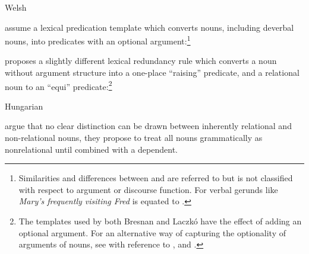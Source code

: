 \documentclass[output=paper,hidelinks]{langscibook}
\begin{document}
\ea\label{Welsharg} Welsh
\z\z

\citet[315--319]{BresnanEtAl2016}  assume a lexical predication template which converts nouns, including deverbal nouns, into predicates with an optional {\POSS} argument:\footnote{Similarities and differences between {\POSS} and {\SUBJ} are referred to but {\POSS} is not classified with respect to argument or discourse function. For verbal gerunds like \emph{Mary's frequently visiting Fred} {\POSS} is equated to {\SUBJ}.}

\eal
{}
\zl	
	
 \citet{Laczko07} proposes a slightly different lexical redundancy rule which converts a noun without argument structure into a one-place ``raising'' predicate, and a relational noun to an ``equi'' predicate:\footnote{The templates used by both Bresnan and Laczk\'o have the effect of adding an optional argument. For an alternative way of capturing the optionality of arguments of nouns, see \citet[293--294]{Lowe17} with reference to \citet{AsudGior12, GiorAsud12}, and \citet{asudeh2014meaning}.}%
 
\ea Hungarian
\z\z
	
\citet[804--805]{Payneetal13} argue that no clear distinction can be drawn between inherently relational and non-relational nouns, they propose to treat all nouns grammatically as nonrelational until combined with a dependent.
\end{document}
